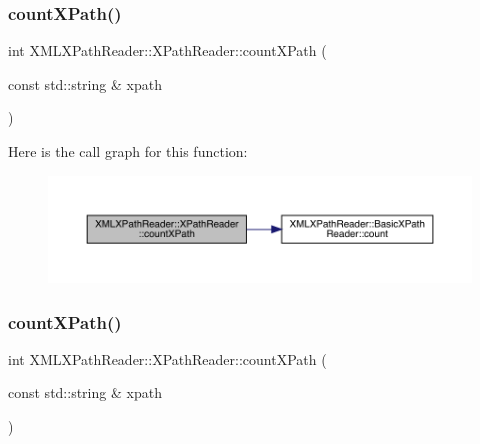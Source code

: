 \subsubsection{\texorpdfstring{countXPath()}{countXPath()}\hspace{0.1cm}{\footnotesize\ttfamily [2/3]}}
{\footnotesize\ttfamily int X\+M\+L\+X\+Path\+Reader\+::\+X\+Path\+Reader\+::count\+X\+Path (\begin{DoxyParamCaption}\item[{const std\+::string \&}]{xpath }\end{DoxyParamCaption})\hspace{0.3cm}{\ttfamily [inline]}}

Here is the call graph for this function\+:
\nopagebreak
\begin{figure}[H]
\begin{center}
\leavevmode
\includegraphics[width=350pt]{d3/d5a/classXMLXPathReader_1_1XPathReader_a9fd76703ea5321a4666ca9a0c07a222a_cgraph}
\end{center}
\end{figure}
\mbox{\label{classXMLXPathReader_1_1XPathReader_a9fd76703ea5321a4666ca9a0c07a222a}} 
\subsubsection{\texorpdfstring{countXPath()}{countXPath()}\hspace{0.1cm}{\footnotesize\ttfamily [3/3]}}
{\footnotesize\ttfamily int X\+M\+L\+X\+Path\+Reader\+::\+X\+Path\+Reader\+::count\+X\+Path (\begin{DoxyParamCaption}\item[{const std\+::string \&}]{xpath }\end{DoxyParamCaption})\hspace{0.3cm}{\ttfamily [inline]}}

